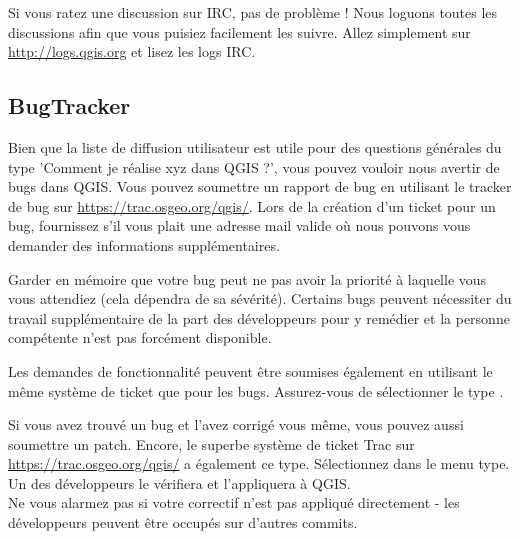 Si vous ratez une discussion sur IRC, pas de problème ! Nous loguons toutes les
discussions afin que vous puisiez facilement les suivre. Allez simplement sur
\url{http://logs.qgis.org} et lisez les logs IRC.

\subsection{BugTracker}
Bien que la liste de diffusion utilisateur est utile pour des questions
générales du type 'Comment je réalise xyz dans QGIS ?', vous pouvez vouloir
nous avertir de bugs dans QGIS. Vous pouvez soumettre un rapport de bug en
utilisant le tracker de bug sur \url{https://trac.osgeo.org/qgis/}. Lors de la
création d'un ticket pour un bug, fournissez s'il vous plait une adresse mail
valide où nous pouvons vous demander des informations supplémentaires.

Garder en mémoire que votre bug peut ne pas avoir la priorité à laquelle vous
vous attendiez (cela dépendra de sa sévérité). Certains bugs peuvent nécessiter du
travail supplémentaire de la part des développeurs pour y remédier et la personne
compétente n'est pas forcément disponible.

Les demandes de fonctionnalité peuvent être soumises également en utilisant le
même système de ticket que pour les bugs. Assurez-vous de sélectionner le type
.

Si vous avez trouvé un bug et l'avez corrigé vous même, vous pouvez
aussi soumettre un patch. Encore, le superbe système de ticket Trac sur
\url{https://trac.osgeo.org/qgis/} a également ce type. Sélectionnez
 dans le menu type. Un des développeurs le vérifiera et
l'appliquera à QGIS.\\
Ne vous alarmez pas si votre correctif n'est pas appliqué directement - les
développeurs peuvent être occupés sur d'autres commits.

